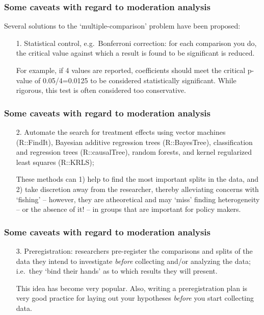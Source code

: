 \documentclass[12pt,english,dvipsnames,aspectratio=169,handout]{beamer}\usepackage[]{graphicx}\usepackage[]{xcolor}
\begin{document}
\begin{frame}
  \frametitle{Some caveats with regard to moderation analysis}
\footnotesize
Several solutions to the `multiple-comparison' problem have been proposed: 

\begin{enumerate}
\item[1.] Statistical control, e.g.\ Bonferroni correction: for each comparison you do, the critical value against which a result is found to be significant is reduced. 

For example, if 4 values are reported, coefficients should meet the critical p-value of 0.05/4=0.0125 to be considered statistically significant. While rigorous, this test is often considered too conservative.
\end{enumerate}

\vspace{1cm}
\end{frame}


\begin{frame}
  \frametitle{Some caveats with regard to moderation analysis}
\footnotesize

\begin{enumerate}
\item[2.] Automate the search for treatment effects using vector machines (R::FindIt), Bayesian additive regression trees (R::BayesTree), classification and regression trees (R::causalTree), random forests, and kernel regularized least squares (R::KRLS);

These methods can 1) help to find the most important splits in the data, and 2) take discretion away from the researcher, thereby alleviating concerns with `fishing' -- however, they are atheoretical and may `miss' finding heterogeneity -- or the absence of it! -- in groups that are important for policy makers.
\end{enumerate}

\vspace{2cm}
\end{frame}

\begin{frame}
  \frametitle{Some caveats with regard to moderation analysis}
\footnotesize

\begin{enumerate}
\item[3.] Preregistration: researchers pre-register the comparisons and splits of the data they intend to investigate \emph{before} collecting and/or analyzing the data; i.e.\ they `bind their hands' as to which results they will present. 

This idea has become very popular. Also, writing a preregistration plan is very good practice for laying out your hypotheses \emph{before} you start collecting data.
\end{enumerate}

\vspace{2cm}
\end{frame}
\end{document}
